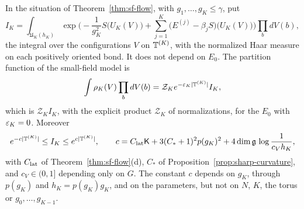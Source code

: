 \begin{corollary}\label{cor:sf-stability}
In the situation of Theorem~\ref{thm:sf-flow}, with $g_1,\dots,g_K\le\gamma$, put
\[
I_K=\int_{\mathfrak U_K(h_K)}\exp\Big(-\frac1{g_K^2}S\big(U_K(V)\big)+\sum_{j=1}^K\big(E^{(j)}-\beta_jS\big)\big(U_K(V)\big)\Big)\prod_bdV(b),
\]
the integral over the configurations $V$ on $\mathbb T^{(K)}$, with the normalized Haar measure on each positively oriented bond. It does not depend on $E_0$. The partition function of the small-field model is
\[
\int\rho_K(V)\prod_bdV(b)=\mathcal Z_Ke^{-\varepsilon_K|\mathbb T^{(K)}|}I_K,
\]
which is $\mathcal Z_KI_K$, with the explicit product $\mathcal Z_K$ of normalizations, for the $E_0$ with $\varepsilon_K=0$. Moreover
\[
e^{-c|\mathbb T^{(K)}|}\le I_K\le e^{c|\mathbb T^{(K)}|},\qquad c=C_{\rm lat}\mathsf K+3(C_*+1)^2p(g_K)^2+4\dim\mathfrak g\,\log\frac1{c_Vh_K},
\]
with $C_{\rm lat}$ of Theorem~\ref{thm:sf-flow}(d), $C_*$ of Proposition~\ref{prop:sharp-curvature}, and $c_V\in(0,1]$ depending only on $G$. The constant $c$ depends on $g_K$, through $p(g_K)$ and $h_K=p(g_K)g_K$, and on the parameters, but not on $N$, $K$, the torus or $g_0,\dots,g_{K-1}$.
\end{corollary}

